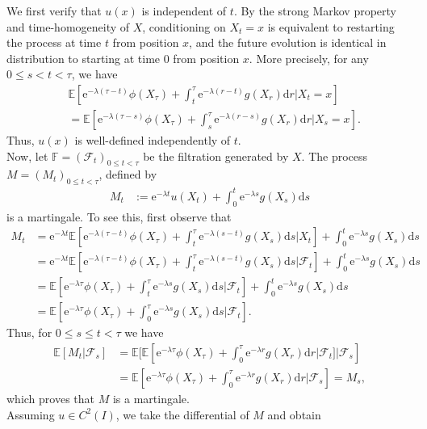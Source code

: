 \documentclass[12pt]{book}
\let\varphi\phi
\numberwithin{equation}{chapter}
\theoremstyle{plain}
\numberwithin{theorem}{section}
\theoremstyle{definition}
\numberwithin{exercise}{chapter}
\let\oldendproof\endproof
\renewenvironment{proof}[1][\proofname]{%
  \oldproof[\scshape\underline{#1}]%
}{\oldendproof}
\newcommand{\<}{\langle}
\renewcommand{\>}{\rangle}
\renewcommand{\(}{\left(}
\renewcommand{\)}{\right)}
\renewcommand{\[}{\left[}
\renewcommand{\]}{\right]}
\newcommand\Eb{\mathds{E}}
\newcommand\Fb{\mathds{F}}
\newcommand\Fc{\mathscr{F}}
\newcommand\lam{\lambda}
\newcommand\dd{\mathrm{d}}
\newcommand\ee{\mathrm{e}}
\begin{document}
\begin{proof}
We first verify that $u(x)$ is independent of $t$.  By the strong Markov property and time-homogeneity of $X$, conditioning on $X_t = x$ is equivalent to restarting the process at time $t$ from position $x$, and the future evolution is identical in distribution to starting at time $0$ from position $x$.  More precisely, for any $0 \leq s < t < \tau$, we have
\begin{align}
&\Eb[ \ee^{-\lam(\tau-t)}\varphi(X_\tau) + \int_t^\tau \ee^{-\lam(r-t)}g(X_r) \dd r | X_t = x ] \\
	&=	\Eb[ \ee^{-\lam(\tau-s)}\varphi(X_\tau) + \int_s^\tau \ee^{-\lam(r-s)}g(X_r) \dd r | X_s = x ] .
\end{align}
Thus, $u(x)$ is well-defined independently of $t$.
\\[0.5em]
Now, let $\Fb=(\Fc_t)_{0 \leq t < \tau}$ be the filtration generated by $X$.
The process $M=(M_t)_{0 \leq t < \tau}$, defined by
\begin{align}
M_t
	&:=	\ee^{-\lam t} u(X_t) + \int_0^t \ee^{-\lam s} g(X_s) \dd s 
\end{align}
is a martingale.  To see this, first observe that
\begin{align}
M_t
	&=	\ee^{-\lam t} \Eb[ \ee^{-\lam(\tau-t)}\varphi(X_\tau) + \int_t^\tau \ee^{-\lam(s-t)}g(X_s) \dd s | X_t ] + \int_0^t \ee^{-\lam s} g(X_s) \dd s \\
	&=	\ee^{-\lam t} \Eb[ \ee^{-\lam(\tau-t)}\varphi(X_\tau) + \int_t^\tau \ee^{-\lam(s-t)}g(X_s) \dd s | \Fc_t ] + \int_0^t \ee^{-\lam s} g(X_s) \dd s \\
	&=	\Eb[ \ee^{- \lam \tau} \varphi(X_\tau) + \int_t^\tau \ee^{-\lam s} g(X_s) \dd s | \Fc_t ] + \int_0^t \ee^{-\lam s} g(X_s) \dd s \\
	&=	\Eb[ \ee^{- \lam \tau} \varphi(X_\tau) + \int_0^\tau \ee^{-\lam s} g(X_s) \dd s | \Fc_t ] .
\end{align}
Thus, for $0 \leq s \leq t < \tau$ we have
\begin{align}
\Eb[ M_t | \Fc_s ]
	&=	\Eb[ \Eb[ \ee^{- \lam \tau} \varphi(X_\tau) + \int_0^\tau \ee^{-\lam r} g(X_r) \dd r | \Fc_t] | \Fc_s ] \\
	&=	\Eb[ \ee^{- \lam \tau} \varphi(X_\tau) + \int_0^\tau \ee^{-\lam r} g(X_r) \dd r | \Fc_s ]
	=		M_s ,
\end{align}
which proves that $M$ is a martingale.
\\[0.5em]
Assuming $u \in C^2(I)$, we take the differential of $M$ and obtain
\begin{align}

\end{align}
\end{proof}
\end{document}
